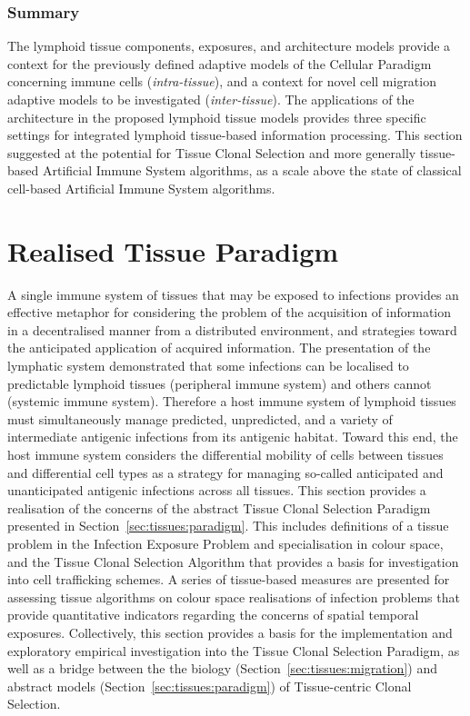 %
%
\subsubsection{Summary}
The lymphoid tissue components, exposures, and architecture models provide a context for the previously defined adaptive models of the Cellular Paradigm concerning immune cells (\emph{intra-tissue}), and a context for novel cell migration adaptive models to be investigated (\emph{inter-tissue}). The applications of the architecture in the proposed lymphoid tissue models provides three specific settings for integrated lymphoid tissue-based information processing. This section suggested at the potential for Tissue Clonal Selection and more generally tissue-based Artificial Immune System algorithms, as a scale above the state of classical cell-based Artificial Immune System algorithms.

%
%
\section{Realised Tissue Paradigm}
\label{subsec:tissues:paradigm:method}
A single immune system of tissues that may be exposed to infections provides an effective metaphor for considering the problem of the acquisition of information in a decentralised manner from a distributed environment, and strategies toward the anticipated application of acquired information. The presentation of the lymphatic system demonstrated that some infections can be localised to predictable lymphoid tissues (peripheral immune system) and others cannot (systemic immune system). Therefore a host immune system of lymphoid tissues must simultaneously manage predicted, unpredicted, and a variety of intermediate antigenic infections from its antigenic habitat. Toward this end, the host immune system considers the differential mobility of cells between tissues and differential cell types as a strategy for managing so-called anticipated and unanticipated antigenic infections across all tissues. 
This section provides a realisation of the concerns of the abstract Tissue Clonal Selection Paradigm presented in Section~\ref{sec:tissues:paradigm}. This includes definitions of a tissue problem in the Infection Exposure Problem and specialisation in colour space, and the Tissue Clonal Selection Algorithm that provides a basis for investigation into cell trafficking schemes. A series of tissue-based measures are presented for assessing tissue algorithms on colour space realisations of infection problems that provide quantitative indicators regarding the concerns of spatial temporal exposures. Collectively, this section provides a basis for the implementation and exploratory empirical investigation into the Tissue Clonal Selection Paradigm, as well as a bridge between the the biology (Section~\ref{sec:tissues:migration}) and abstract models (Section~\ref{sec:tissues:paradigm}) of Tissue-centric Clonal Selection.

